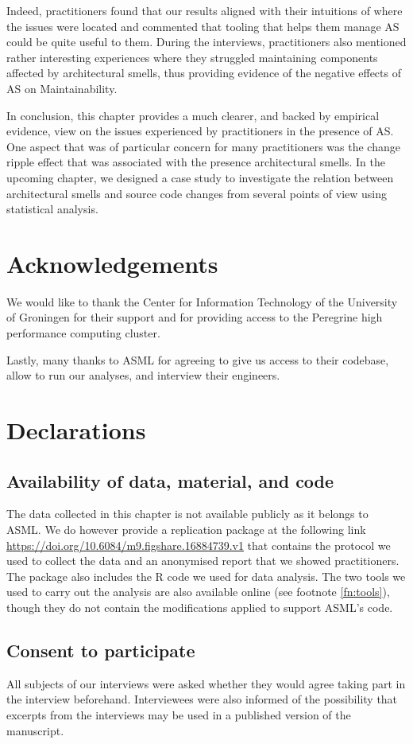 Indeed, practitioners found that our results aligned with their intuitions of where the issues were located and commented that tooling that helps them manage AS could be quite useful to them.
During the interviews, practitioners also mentioned rather interesting experiences where they struggled maintaining components affected by architectural smells, thus providing evidence of the negative effects of AS on Maintainability.

In conclusion, this chapter provides a much clearer, and backed by empirical evidence, view on the issues experienced by practitioners in the presence of AS.
One aspect that was of particular concern for many practitioners was the change ripple effect that was associated with the presence architectural smells.
In the upcoming chapter, we designed a case study to investigate the relation between architectural smells and source code changes from several points of view using statistical analysis.


\section*{Acknowledgements}
We would like to thank the Center for Information Technology of the University of Groningen for their support and for providing access to the Peregrine high performance computing cluster.

Lastly, many thanks to ASML for agreeing to give us access to their codebase, allow to run our analyses, and interview their engineers.

\section*{Declarations}
\subsection*{Availability of data, material, and code}
The data collected in this chapter is not available publicly as it belongs to ASML.
We do however provide a replication package at the following link \url{https://doi.org/10.6084/m9.figshare.16884739.v1} that contains the protocol we used to collect the data and an anonymised report that we showed practitioners.
The package also includes the R code we used for data analysis.
The two tools we used to carry out the analysis are also available online (see footnote \ref{fn:tools}), though they do not contain the modifications applied to support ASML's code.

\subsection*{Consent to participate}
All subjects of our interviews were asked whether they would agree taking part in the interview beforehand. Interviewees were also informed of the possibility that excerpts from the interviews may be used in a published version of the manuscript.
